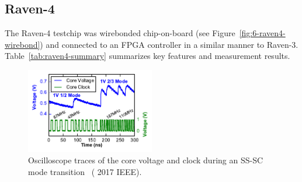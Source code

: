 \documentclass[graybox]{svmult}
\begin{document}
\subsection{Raven-4}

The Raven-4 testchip was wirebonded chip-on-board (see Figure~\ref{fig:6-raven4-wirebond}) and connected to an FPGA controller in a similar manner to Raven-3.
Table~\ref{tab:raven4-summary} summarizes key features and measurement results.


\begin{figure}
  \centering
  \includegraphics[width=0.5\textwidth]{6-raven4-waveforms}
  \caption{Oscilloscope traces of the core voltage and clock during an SS-SC mode transition~\cite{Keller2017} ({\textcopyright} 2017 IEEE).}
  \label{fig:6-raven4-waveforms}
\end{figure}
\end{document}
